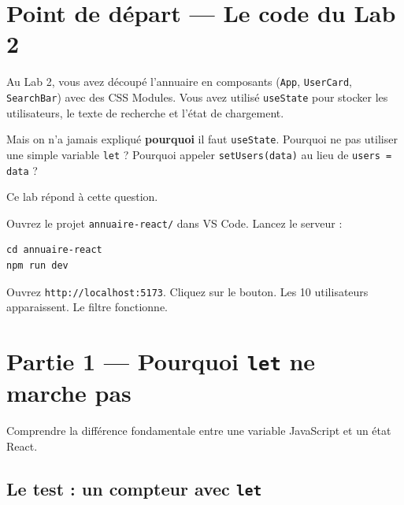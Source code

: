 \documentclass[11pt,a4paper]{article}
\begin{document}
\section{Point de départ --- Le code du Lab 2}
\label{sec:starter}

Au Lab 2, vous avez découpé l'annuaire en composants (\texttt{App}, \texttt{UserCard}, \texttt{SearchBar}) avec des CSS Modules. Vous avez utilisé \texttt{useState} pour stocker les utilisateurs, le texte de recherche et l'état de chargement.

Mais on n'a jamais expliqué \textbf{pourquoi} il faut \texttt{useState}. Pourquoi ne pas utiliser une simple variable \texttt{let} ? Pourquoi appeler \texttt{setUsers(data)} au lieu de \texttt{users = data} ?

Ce lab répond à cette question.

\begin{objectifbox}
Ouvrez le projet \texttt{annuaire-react/} dans VS Code. Lancez le serveur :

\begin{lstlisting}[style=terminal]
cd annuaire-react
npm run dev
\end{lstlisting}

Ouvrez \texttt{http://localhost:5173}. Cliquez sur le bouton. Les 10 utilisateurs apparaissent. Le filtre fonctionne.
\end{objectifbox}

\section{Partie 1 --- Pourquoi \texttt{let} ne marche pas}
\label{sec:let}

\begin{objectifbox}
Comprendre la différence fondamentale entre une variable JavaScript et un état React.
\end{objectifbox}

\subsection{Le test : un compteur avec \texttt{let}}
\end{document}
